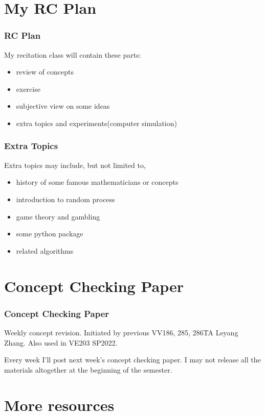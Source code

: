 \documentclass{beamer}
\begin{document}
\section{My RC Plan}
\begin{frame}
    \frametitle{RC Plan}
    My recitation class will contain these parts:
    \begin{itemize}
        \item review of concepts
        \item exercise
        \item subjective view on some ideas
        \item extra topics and experiments(computer simulation)
    \end{itemize}
\end{frame}

\begin{frame}
    \frametitle{Extra Topics}
    Extra topics may include, but not limited to,
    \begin{itemize}
        \item history of some famous mathematicians or concepts
        \item introduction to random process
        \item game theory and gambling
        \item some python package
        \item related algorithms
    \end{itemize}
    
\end{frame}

\section{Concept Checking Paper}
\begin{frame}
    \frametitle{Concept Checking Paper}
    Weekly concept revision. Initiated by previous VV186, 285, 286TA Leyang Zhang. Also used in VE203 SP2022.\par
    \vspace{0.3cm}
    Every week I'll post next week's concept checking paper. I may not release all the materials altogether at the beginning of the semester.



\end{frame}


\section{More resources}
\end{document}
